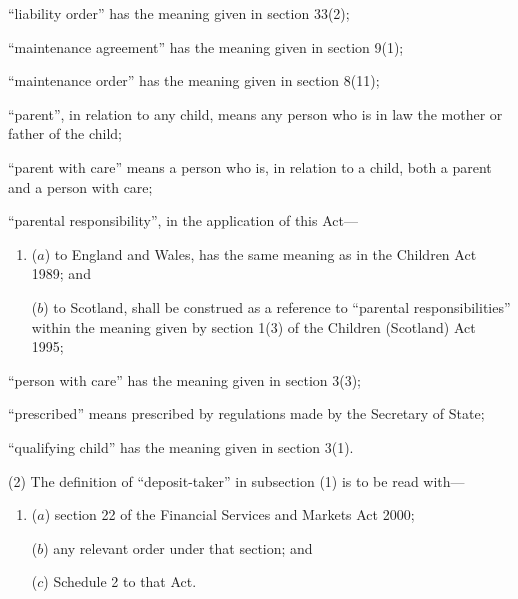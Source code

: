 \documentclass[a4paper]{article}
\begin{document}
\begin{enumerate}
“liability order” has the meaning given in section 33(2);

“maintenance agreement” has the meaning given in section 9(1);



“maintenance order” has the meaning given in section 8(11);


“parent”, in relation to any child, means any person who is in law the mother
or father of the child;

“parent with care” means a person who is, in relation to a child, both a parent and
a person with care;

“parental responsibility”, in the application of this Act---
\begin{enumerate}\item[]
($a$) to England and Wales, has the same meaning as in the Children Act 1989; and

($b$) to Scotland, shall be construed as a reference to “parental responsibilities” within the meaning given by section 1(3) of the Children (Scotland) Act 1995;
\end{enumerate}


“person with care” has the meaning given in section 3(3);

“prescribed” means prescribed by regulations made by the Secretary of State;

“qualifying child” has the meaning given in section 3(1).
\end{enumerate}

(2) The definition of “deposit-taker” in subsection (1) is to be read with—
\begin{enumerate}\item[]
($a$) section 22 of the Financial Services and Markets Act 2000;

($b$) any relevant order under that section; and

($c$) Schedule 2 to that Act.
\end{enumerate}
\end{document}
